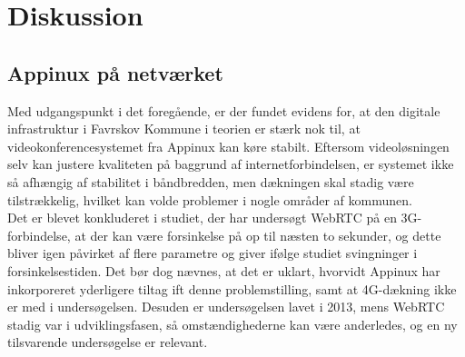 \section{Diskussion}
\subsection{Appinux på netværket}
Med udgangspunkt i det foregående, er der fundet evidens for, at den digitale infrastruktur i Favrskov Kommune i teorien er stærk nok til, at videokonferencesystemet fra Appinux kan køre stabilt. Eftersom videoløsningen selv kan justere kvaliteten på baggrund af internetforbindelsen, er systemet ikke så afhængig af stabilitet i båndbredden, men dækningen skal stadig være tilstrækkelig, hvilket kan volde problemer i nogle områder af kommunen.\\
Det er blevet konkluderet i studiet\cite{webrtcjournal}, der har undersøgt WebRTC på en 3G-forbindelse, at der kan være forsinkelse på op til næsten to sekunder, og dette bliver igen påvirket af flere parametre og giver ifølge studiet svingninger i forsinkelsestiden. Det bør dog nævnes, at det er uklart, hvorvidt Appinux har inkorporeret yderligere tiltag ift denne problemstilling, samt at 4G-dækning ikke er med i undersøgelsen. Desuden er undersøgelsen lavet i 2013, mens WebRTC stadig var i udviklingsfasen, så omstændighederne kan være anderledes, og en ny tilsvarende undersøgelse er relevant.
